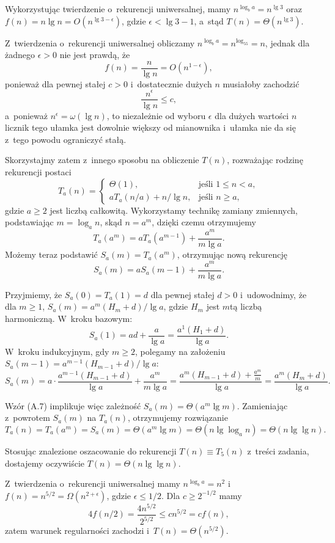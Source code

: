 
\subproblem %
Wykorzystując twierdzenie o~rekurencji uniwersalnej, mamy $n^{\log_ba}=n^{\lg3}$ oraz $f(n)=n\lg n=O(n^{\lg3-\epsilon})$, gdzie $\epsilon<\lg3-1$, a~stąd $T(n)=\Theta(n^{\lg3})$.

\subproblem %
Z~twierdzenia o~rekurencji uniwersalnej obliczamy $n^{\log_ba}=n^{\log_55}=n$, jednak dla żadnego $\epsilon>0$ nie jest prawdą, że
\[
	f(n) = \frac{n}{\lg n} = O(n^{1-\epsilon}),
\]
ponieważ dla pewnej stałej $c>0$ i~dostatecznie dużych $n$ musiałoby zachodzić
\[
	\frac{n^\epsilon}{\lg n} \le c,
\]
a~ponieważ $n^\epsilon=\omega(\lg n)$, to niezależnie od wyboru $\epsilon$ dla dużych wartości $n$ licznik tego ułamka jest dowolnie większy od mianownika i~ułamka nie da się z~tego powodu ograniczyć stałą.

Skorzystajmy zatem z~innego sposobu na obliczenie $T(n)$, rozważając rodzinę rekurencji postaci
\[
	T_a(n) = \begin{cases}
		\Theta(1), & \text{jeśli $1\le n<a$}, \\
		aT_a(n/a)+n/\!\lg n, & \text{jeśli $n\ge a$},
	\end{cases}
\]
gdzie $a\ge2$ jest liczbą całkowitą.
Wykorzystamy technikę zamiany zmiennych, podstawiając $m=\log_an$, skąd $n=a^m$, dzięki czemu otrzymujemy
\[
	T_a(a^m) = aT_a(a^{m-1})+\frac{a^m}{m\lg a}.
\]
Możemy teraz podstawić $S_a(m)=T_a(a^m)$, otrzymując nową rekurencję
\[
	S_a(m) = aS_a(m-1)+\frac{a^m}{m\lg a}.
\]

Przyjmiemy, że $S_a(0)=T_a(1)=d$ dla pewnej stałej $d>0$ i~udowodnimy, że dla $m\ge1$, $S_a(m)=a^m(H_m+d)/\lg a$, gdzie $H_m$ jest $m$\nbhyphen tą liczbą harmoniczną.
W~kroku bazowym:
\[
	S_a(1) = ad+\frac{a}{\lg a} = \frac{a^1(H_1+d)}{\lg a}.
\]
W~kroku indukcyjnym, gdy $m\ge2$, polegamy na założeniu $S_a(m-1)=a^{m-1}(H_{m-1}+d)/\lg a$:
\[
	S_a(m) = a\cdot\frac{a^{m-1}(H_{m-1}+d)}{\lg a}+\frac{a^m}{m\lg a} = \frac{a^m(H_{m-1}+d)+\frac{a^m}{m}}{\lg a} = \frac{a^m(H_m+d)}{\lg a}.
\]

Wzór (A.7) implikuje więc zależność $S_a(m)=\Theta(a^m\lg m)$.
Zamieniając z~powrotem $S_a(m)$ na $T_a(n)$, otrzymujemy rozwiązanie
\[
	T_a(n) = T_a(a^m) = S_a(m) = \Theta(a^m\lg m) = \Theta(n\lg\log_a n) = \Theta(n\lg\lg n).
\]

Stosując znalezione oszacowanie do rekurencji $T(n)\equiv T_5(n)$ z~treści zadania, dostajemy oczywiście $T(n)=\Theta(n\lg\lg n)$.

\subproblem %
Z~twierdzenia o~rekurencji uniwersalnej mamy $n^{\log_ba}=n^2$ i~$f(n)=n^{5/2}=\Omega(n^{2+\epsilon})$, gdzie $\epsilon\le1/2$.
Dla $c\ge2^{-1/2}$ mamy
\[
	4f(n/2) = \frac{4n^{5/2}}{2^{5/2}} \le cn^{5/2} = cf(n),
\]
zatem warunek regularności zachodzi i~$T(n)=\Theta(n^{5/2})$.

